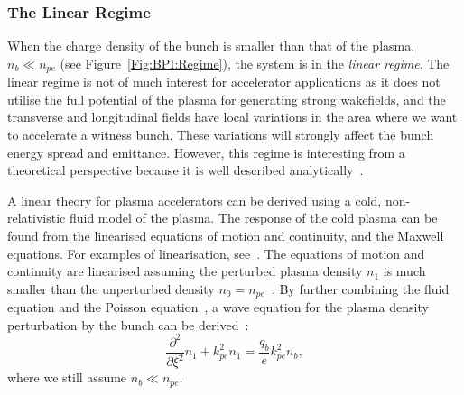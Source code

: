 \subsubsection{The Linear Regime}
\label{Int:BPI:Lin}

When the charge density of the bunch is smaller than that of the plasma, $n_{b} \ll n_{pe}$ (see Figure~\ref{Fig:BPI:Regime}), the system is in the \textit{linear regime}.
The linear regime is not of much interest for accelerator applications as it does not utilise the full potential of the plasma for generating strong wakefields, and the transverse and longitudinal fields have local variations in the area where we want to accelerate a witness bunch.
These variations will strongly affect the bunch energy spread and emittance.
However, this regime is interesting from a theoretical perspective because it is well described analytically~\cite{muggli:2017}.

A linear theory for plasma accelerators can be derived using a cold, non-relativistic fluid model of the plasma.
The response of the cold plasma can be found from the linearised equations of motion and continuity, and the Maxwell equations. For examples of linearisation, see~\cite{pecseli:2012,chen:1974}.
The equations of motion and continuity are linearised assuming the perturbed plasma density $n_{1}$ is much smaller than the unperturbed density $n_{0} = n_{pe}$~\cite{chen:1987}.
By further combining the fluid equation and the Poisson equation~\cite{katsouleas:1987}, a wave equation for the plasma density perturbation by the bunch can be derived~\cite{chen:1987,muggli:2017}:
\begin{equation}
    \frac{\partial^{2}}{\partial\xi^{2}}n_{1} + k_{pe}^{2}n_{1} = \frac{q_{b}}{e}k_{pe}^{2}n_{b}, \label{EQ:BeamPlasmaWF}
\end{equation}
where we still assume $n_{b} \ll n_{pe}$.

